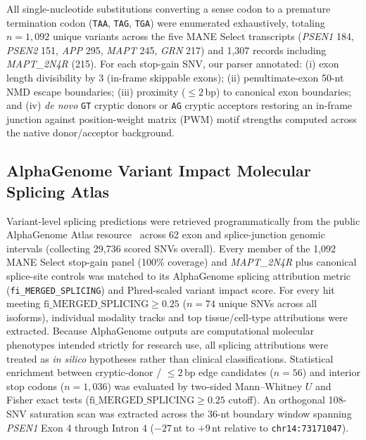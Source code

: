 \documentclass[11pt,a4paper]{article}
\begin{document}
All single-nucleotide substitutions converting a sense codon to a premature termination codon (\texttt{TAA}, \texttt{TAG}, \texttt{TGA}) were enumerated exhaustively, totaling $n=1,092$ unique variants across the five MANE Select transcripts (\textit{PSEN1} 184, \textit{PSEN2} 151, \textit{APP} 295, \textit{MAPT} 245, \textit{GRN} 217) and 1,307 records including \textit{MAPT\_2N4R} (215). For each stop-gain SNV, our parser annotated: (i) exon length divisibility by 3 (in-frame skippable exons); (ii) penultimate-exon 50-nt NMD escape boundaries; (iii) proximity ($\leq 2$\,bp) to canonical exon boundaries; and (iv) \textit{de novo} \texttt{GT} cryptic donors or \texttt{AG} cryptic acceptors restoring an in-frame junction against position-weight matrix (PWM) motif strengths computed across the native donor/acceptor background.

\subsection{AlphaGenome Variant Impact Molecular Splicing Atlas}
Variant-level splicing predictions were retrieved programmatically from the public AlphaGenome Atlas resource~\cite{avsec2026,alphagenome_atlas2026} across 62 exon and splice-junction genomic intervals (collecting 29,736 scored SNVs overall). Every member of the 1,092 MANE Select stop-gain panel (100\% coverage) and \textit{MAPT\_2N4R} plus canonical splice-site controls was matched to its AlphaGenome splicing attribution metric (\texttt{fi\_MERGED\_SPLICING}) and Phred-scaled variant impact score. For every hit meeting $\mathrm{fi\_MERGED\_SPLICING} \geq 0.25$ ($n=74$ unique SNVs across all isoforms), individual modality tracks and top tissue/cell-type attributions were extracted. Because AlphaGenome outputs are computational molecular phenotypes intended strictly for research use, all splicing attributions were treated as \textit{in silico} hypotheses rather than clinical classifications. Statistical enrichment between cryptic-donor / $\leq 2$\,bp edge candidates ($n=56$) and interior stop codons ($n=1,036$) was evaluated by two-sided Mann--Whitney $U$ and Fisher exact tests ($\mathrm{fi\_MERGED\_SPLICING} \geq 0.25$ cutoff). An orthogonal 108-SNV saturation scan was extracted across the 36-nt boundary window spanning \textit{PSEN1} Exon 4 through Intron 4 ($-27$\,nt to $+9$\,nt relative to \texttt{chr14:73171047}).
\end{document}
